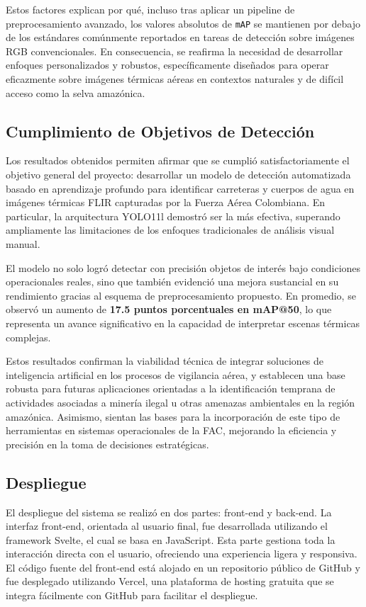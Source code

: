 Estos factores explican por qué, incluso tras aplicar un pipeline de preprocesamiento avanzado, los valores absolutos de \texttt{mAP} se mantienen por debajo de los estándares comúnmente reportados en tareas de detección sobre imágenes RGB convencionales. En consecuencia, se reafirma la necesidad de desarrollar enfoques personalizados y robustos, específicamente diseñados para operar eficazmente sobre imágenes térmicas aéreas en contextos naturales y de difícil acceso como la selva amazónica.


\subsection{Cumplimiento de Objetivos de Detección}

Los resultados obtenidos permiten afirmar que se cumplió satisfactoriamente el objetivo general del proyecto: desarrollar un modelo de detección automatizada basado en aprendizaje profundo para identificar carreteras y cuerpos de agua en imágenes térmicas FLIR capturadas por la Fuerza Aérea Colombiana. En particular, la arquitectura YOLO11l demostró ser la más efectiva, superando ampliamente las limitaciones de los enfoques tradicionales de análisis visual manual.

El modelo no solo logró detectar con precisión objetos de interés bajo condiciones operacionales reales, sino que también evidenció una mejora sustancial en su rendimiento gracias al esquema de preprocesamiento propuesto. En promedio, se observó un aumento de \textbf{17.5 puntos porcentuales en mAP@50}, lo que representa un avance significativo en la capacidad de interpretar escenas térmicas complejas.

Estos resultados confirman la viabilidad técnica de integrar soluciones de inteligencia artificial en los procesos de vigilancia aérea, y establecen una base robusta para futuras aplicaciones orientadas a la identificación temprana de actividades asociadas a minería ilegal u otras amenazas ambientales en la región amazónica. Asimismo, sientan las bases para la incorporación de este tipo de herramientas en sistemas operacionales de la FAC, mejorando la eficiencia y precisión en la toma de decisiones estratégicas.


\subsection{Despliegue}
El despliegue del sistema se realizó en dos partes: front-end y back-end.
La interfaz front-end, orientada al usuario final, fue desarrollada utilizando el framework Svelte, el cual se basa en JavaScript. Esta parte gestiona toda la interacción directa con el usuario, ofreciendo una experiencia ligera y responsiva. El código fuente del front-end está alojado en un repositorio público de GitHub y fue desplegado utilizando Vercel, una plataforma de hosting gratuita que se integra fácilmente con GitHub para facilitar el despliegue.

